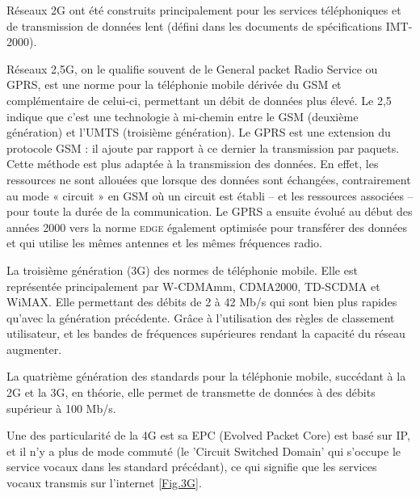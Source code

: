 Réseaux 2G ont été construits principalement pour les services téléphoniques et de transmission de données lent (défini dans les documents de spécifications IMT-2000).

Réseaux \textsf{2,5G}, on le qualifie souvent de le General packet Radio Service ou GPRS, est une norme pour la téléphonie mobile dérivée du GSM et complémentaire de celui-ci, permettant un débit de données plus élevé. Le 2,5 indique que c'est une technologie à mi-chemin entre le GSM (deuxième génération) et l'UMTS (troisième génération). Le GPRS est une extension du protocole GSM : il ajoute par rapport à ce dernier la transmission par paquets. Cette méthode est plus adaptée à la transmission des données. En effet, les ressources ne sont allouées que lorsque des données sont échangées, contrairement au mode « circuit » en GSM où un circuit est établi – et les ressources associées – pour toute la durée de la communication. Le GPRS a ensuite évolué au début des années 2000 vers la norme \textsc{edge} également optimisée pour transférer des données et qui utilise les mêmes antennes et les mêmes fréquences radio.

La troisième génération (3G) des normes de téléphonie mobile. Elle est représentée principalement par W-CDMAmm, CDMA2000, TD-SCDMA et WiMAX. Elle permettant des débits de 2 à 42 Mb/s qui sont bien plus rapides qu'avec la génération précédente. Grâce à l'utilisation des règles de classement utilisateur, et les  bandes de fréquences supérieures rendant la capacité du réseau augmenter.

La quatrième génération des standards pour la téléphonie mobile, succédant à la 2G et la 3G, en théorie, elle permet de transmette de données à des débits supérieur à 100 Mb/s. 

Une des particularité de la 4G est sa EPC (Evolved Packet Core) est basé sur IP, et il n'y a plus de mode commuté (le 'Circuit Switched Domain' qui s'occupe le service vocaux dans les standard précédant), ce qui signifie que les services vocaux transmis sur l'internet \ref{Fig.3G}. 

